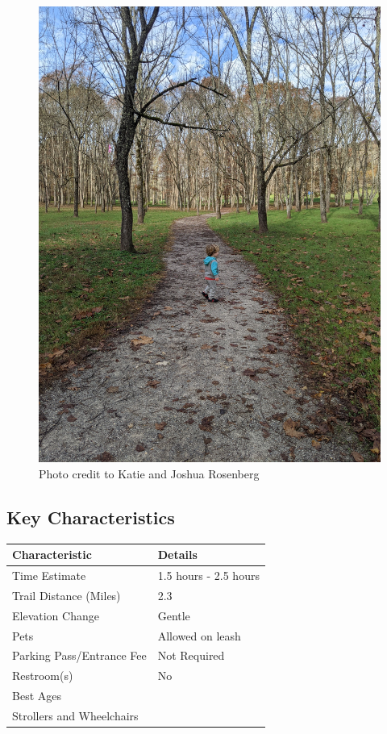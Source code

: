 \documentclass[
  letterpaper,
  DIV=11,
  numbers=noendperiod]{scrreprt}
\begin{document}
\begin{figure}[H]

{\centering \includegraphics[width=6.25in,height=\textheight,keepaspectratio]{img/trail-11-figure-01.jpg}

}

\caption{Photo credit to Katie and Joshua Rosenberg}

\end{figure}%

\subsection{Key Characteristics}\label{key-characteristics-9}

\begin{longtable}[]{@{}ll@{}}
\toprule\noalign{}
\textbf{Characteristic} & \textbf{Details} \\
\midrule\noalign{}
\endhead
\bottomrule\noalign{}
\endlastfoot
Time Estimate & 1.5 hours - 2.5 hours \\
Trail Distance (Miles) & 2.3 \\
Elevation Change & Gentle \\
Pets & Allowed on leash \\
Parking Pass/Entrance Fee & Not Required \\
Restroom(s) & No \\
Best Ages & \\
Strollers and Wheelchairs & \\
\end{longtable}
\end{document}
